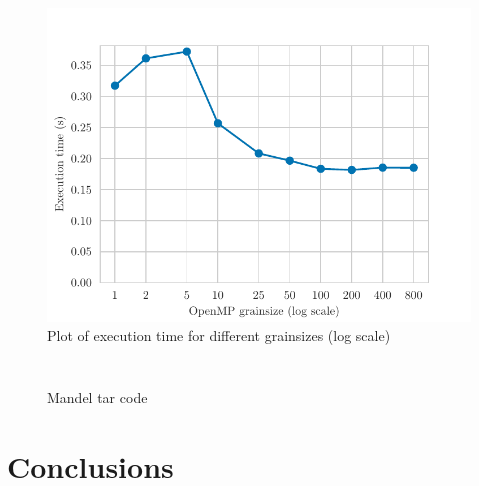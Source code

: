 \begin{figure}[H]
    \centering
    \includegraphics{plots/grainsize_log.pdf}
    \caption{Plot of execution time for different grainsizes (log scale)}
    \label{fig:grain_log} 
\end{figure}

\begin{figure}[H]
    \centering
    \caption{Mandel tar code}
    \inputminted[firstline=91,lastline=127]{c}{sources/mandel-tar.c}
    \vspace{-2em}
    \inputminted[firstline=200,lastline=210]{c}{sources/mandel-tar.c}
    \label{fig:grain_log} 
\end{figure}

\section{Conclusions}%
\label{sec:Conclusions}




